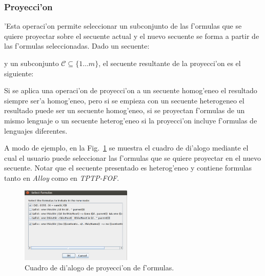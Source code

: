 \subsubsection{Proyecci'on}

'Esta operaci'on  permite seleccionar un subconjunto de las f'ormulas que se quiere proyectar sobre el secuente actual y el nuevo secuente se forma a partir de las f'ormulas seleccionadas.
Dado un secuente:

\begin{prooftree}
\end{prooftree}

y un subconjunto $\mathcal{C} \subseteq \{1 \ldots m\}$, el secuente resultante de la proyecci'on es el siguiente:

\begin{prooftree}
\end{prooftree}

Si se aplica una operaci'on de proyecci'on a un secuente homog'eneo el resultado siempre ser'a homog'eneo, pero si se empieza con un secuente heterogeneo el resultado puede ser un secuente homog'eneo, si se proyectan f'ormulas de un mismo lenguaje o un secuente heterog'eneo si la proyecci'on incluye f'ormulas de lenguajes diferentes.

A modo de ejemplo, en la Fig.~\ref{seq selection} se muestra el cuadro de di'alogo mediante el cual el usuario puede seleccionar las f'ormulas que se quiere proyectar en el nuevo secuente. Notar que el secuente presentado es heterog'eneo y contiene formulas tanto en \textit{Alloy} como en \textit{TPTP-FOF}.

\begin{figure}[]
	\includegraphics[width=200px]{img/select.png}
	\centering
	\caption{Cuadro de di'alogo de proyecci'on de f'ormulas.}
        \label{seq selection}
\end{figure}

